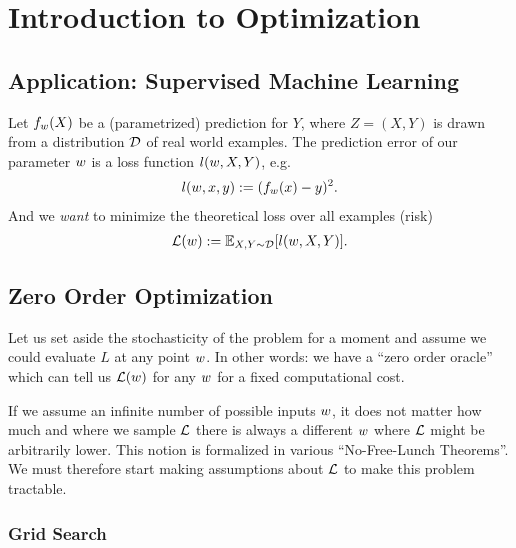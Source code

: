
\chapter{Introduction to Optimization}

\section{Application: Supervised Machine Learning}

Let \(f_{w}(X)\) be a (parametrized) prediction for \(Y\), where \(Z=(X,Y)\)
is drawn from a distribution \(\mathcal{D}\) of real world examples. The prediction
error of our parameter \(w\) is a loss function \(l(w, X, Y)\), e.g. 
%
\begin{align*}
	l(w, x, y) := (f_{w}(x) - y)^2.
\end{align*}
%
And we \emph{want} to minimize the theoretical loss over all examples (risk)
%
\begin{align*}
	\mathcal{L}(w) := \mathbb{E}_{X,Y\sim \mathcal{D}} [l(w, X, Y)].
\end{align*}

\section{Zero Order Optimization}

Let us set aside the stochasticity of the problem for a moment and assume we
could evaluate \(L\) at any point \(w\). In other words: we have a ``zero
order oracle'' which can tell us \(\mathcal{L}(w)\) for any \(w\) for a fixed
computational cost.

If we assume an infinite number of possible inputs \(w\), it does not matter
how much and where we sample \(\mathcal{L}\) there is always a different \(w\) where
\(\mathcal{L}\) might be arbitrarily lower. This notion is formalized in various ``No-Free-Lunch
Theorems''. We must therefore start making assumptions about \(\mathcal{L}\) to make this
problem tractable.

\subsection{Grid Search}


